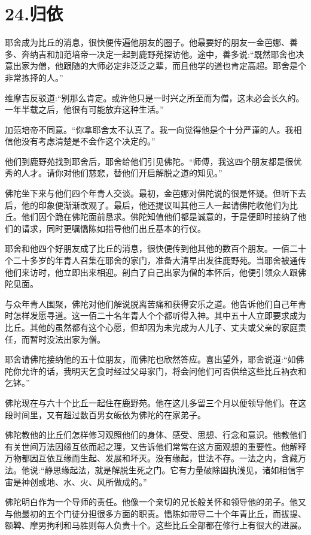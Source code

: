 \documentclass[12pt,twoside,openany]{book}
\begin{document}
\chapter{24.归依}\label{ch24}

耶舍成为比丘的消息，很快便传遍他朋友的圈子。他最要好的朋友一金芭娜、善多、奔纳吉和加范培帝一决定一起到鹿野苑探访他。途中，善多说:“既然耶舍也决意出家为僧，他跟随的大师必定非泛泛之辈，而且他学的道也肯定高超。耶舍是个非常拣择的人。”

维摩吉反驳道:“别那么肯定。或许他只是一时兴之所至而为僧，这未必会长久的。一年半载之后，他很有可能放弃这种生活。”

加范培帝不同意。“你拿耶舍太不认真了。我一向觉得他是个十分严谨的人。我相信他没有考虑清楚是不会作这个决定的。”

他们到鹿野苑找到耶舍后，耶舍给他们引见佛陀。“师傅，我这四个朋友都是很优秀的人才。请你对他们慈悲，替他们开启解脱之道的知见。”

佛陀坐下来与他们四个年青人交谈。最初，金芭娜对佛陀说的很是怀疑。但听下去后，他的印象便渐渐改观了。最后，他还提议叫其他三人一起请佛陀收他们为比丘。他们因个跪在佛陀面前恳求。佛陀知值他们都是诚意的，于是便即时接纳了他们的请求，同时更嘱憍陈如指导他们出丘基本的行仪。

耶舍和他四个好朋友成了比丘的消息，很快便传到他其他的数百个朋友。一佰二十个二十多岁的年青人召集在耶舍的家门，准备大清早出发往鹿野苑。当耶舍被通传他们来访时，他立即出来相迎。剖白了自己出家为僧的本怀后，他便引领众人跟佛陀见面。

与众年青人围聚，佛陀对他们解说脱离苦痛和获得安乐之道。他告诉他们自己年青时怎样发愿寻道。这一佰二十名年青人个个都听得入神。其中五十人立即要求成为比丘。其他的虽然都有这个心愿，但却因为未完成为人儿子、丈夫或父亲的家庭责任，而暂时没法出家为僧。

耶舍请佛陀接纳他的五十位朋友，而佛陀也欣然答应。喜出望外，耶舍说道:“如佛陀你允许的话，我明天乞食时经过父母家门，将会问他们可否供给这些比丘衲衣和乞钵。”

佛陀现在与六十个比丘一起住在鹿野苑。他在这儿多留三个月以便领导他们。在这段时间里，又有超过数百男女皈依为佛陀的在家弟子。

佛陀教他的比丘们怎样修习观照他们的身体、感受、思想、行念和意识。他教他们有关世间万法因缘互依而起之理，又告诉他们常常在这方面观想的重要性。他解释万物都因互依互缘而生起、发展和坏灭。没有缘起，世法不存。一法之内，含藏万法。他说:“静思缘起法，就是解脱生死之门。它有力量破除固执浅见，诸如相信宇宙是神创或地、水、火、风所做成的。”

佛陀明白作为一个导师的责任。他像一个亲切的兄长般关怀和领导他的弟子。他又与他最初的五个门徒分担很多方面的职责。憍陈如带导二十个年青比丘，而拔提、额鞞、摩男拘利和马胜则每人负责十个。这些比丘全部都在修行上有很大的进展。
\end{document}
